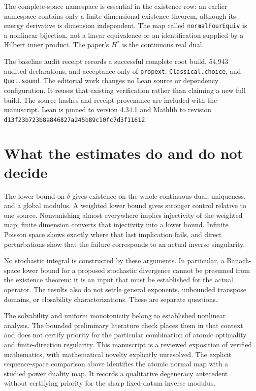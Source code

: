 \documentclass[11pt]{article}
\theoremstyle{remark}\newtheorem{remark}[theorem]{Remark}
\newcommand{\code}[1]{{\small\nolinkurl{#1}}}
\begin{document}
The complete-space namespace is essential in the existence row:
an earlier namespace contains only a finite-dimensional existence
theorem, although its energy derivative is dimension independent.
The map called \code{normalFourEquiv} is a nonlinear bijection,
not a linear equivalence or an identification supplied by a Hilbert
inner product. The paper's $H^*$ is the continuous real dual.

The baseline audit receipt records a successful complete root build,
54,943 audited declarations, and acceptance only of
\code{propext}, \code{Classical.choice}, and \code{Quot.sound}.
The editorial work changes no Lean source or dependency configuration.
It reuses that existing verification rather than claiming a new full
build. The source hashes and receipt provenance are included with the
manuscript. Lean is pinned to version 4.34.1 and Mathlib to revision
\code{d13f23b723b8a846827a245b89c10fc7d3f11612}.

\section{What the estimates do and do not decide}
The lower bound on $\delta$ gives existence on the whole continuous
dual, uniqueness, and a global modulus. A weighted lower bound gives
stronger control relative to one source. Nonvanishing almost everywhere
implies injectivity of the weighted map; finite dimension converts
that injectivity into a lower bound. Infinite Poisson space shows
exactly where that last implication fails, and direct perturbations
show that the failure corresponds to an actual inverse singularity.

No stochastic integral is constructed by these arguments. In
particular, a Banach-space lower bound for a proposed stochastic
divergence cannot be presumed from the existence theorem: it is an
input that must be established for the actual operator. The results
also do not settle general exponents, unbounded transpose domains,
or closability characterizations. These are separate questions.

The solvability and uniform monotonicity belong to established
nonlinear analysis. The bounded preliminary literature check places
them in that context and does not certify priority for the particular
combination of atomic optimality and finite-direction regularity.
This manuscript is a reviewed exposition of verified mathematics,
with mathematical novelty explicitly unresolved. The explicit sequence-space comparison above identifies the atomic
normal map with a studied power duality map. It records a qualitative
degeneracy antecedent without certifying priority for the sharp
fixed-datum inverse modulus.
\end{document}
